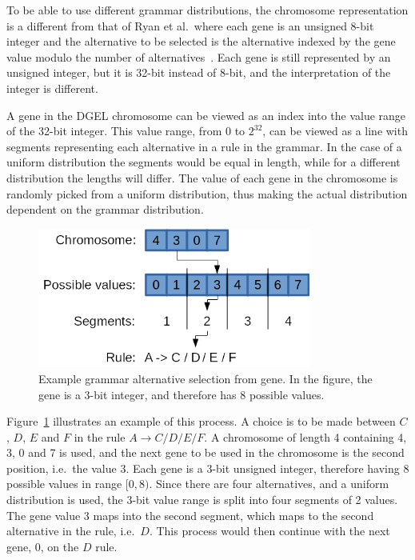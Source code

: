 To be able to use different grammar distributions, the chromosome representation is a different from that of Ryan et al.\ where each gene is an unsigned 8-bit integer and the alternative to be selected is the alternative indexed by the gene value modulo the number of alternatives~\cite{1998Ryan}.
Each gene is still represented by an unsigned integer, but it is 32-bit instead of 8-bit, and the interpretation of the integer is different.

A gene in the \gls{DGEL} chromosome can be viewed as an index into the value range of the 32-bit integer.
This value range, from $0$ to $2^{32}$, can be viewed as a line with segments representing each alternative in a rule in the grammar.
In the case of a uniform distribution the segments would be equal in length, while for a different distribution the lengths will differ.
The value of each gene in the chromosome is randomly picked from a uniform distribution, thus making the actual distribution dependent on the grammar distribution.

\begin{figure}
    \centering
    \includegraphics[width=0.8\textwidth]{figures/gene}
    \caption[Example grammar alternative selection from gene]{Example grammar alternative selection from gene. In the figure, the gene is a 3-bit integer, and therefore has 8 possible values.}
    \label{fig:gene}
\end{figure}

Figure~\ref{fig:gene} illustrates an example of this process.
A choice is to be made between $C$, $D$, $E$ and $F$ in the rule $A \rightarrow C / D / E / F$.
A chromosome of length 4 containing 4, 3, 0 and 7 is used, and the next gene to be used in the chromosome is the second position, i.e.\ the value 3.
Each gene is a 3-bit unsigned integer, therefore having 8 possible values in range $[0, 8)$.
Since there are four alternatives, and a uniform distribution is used, the 3-bit value range is split into four segments of 2 values.
The gene value 3 maps into the second segment, which maps to the second alternative in the rule, i.e.\ $D$.
This process would then continue with the next gene, 0, on the $D$ rule.

